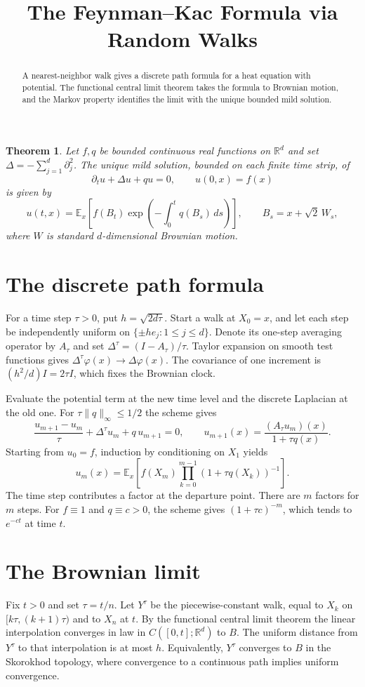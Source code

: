 \documentclass[11pt]{article}
\title{The Feynman--Kac Formula via Random Walks}
\author{}
\date{}
\newtheorem{theorem}{Theorem}
\begin{document}
\maketitle

\begin{abstract}
A nearest-neighbor walk gives a discrete path formula for a heat equation
with potential. The functional central limit theorem takes the formula to
Brownian motion, and the Markov property identifies the limit with the
unique bounded mild solution.
\end{abstract}

\begin{theorem}
Let $f,q$ be bounded continuous real functions on $\mathbb R^d$ and set
$\Delta=-\sum_{j=1}^d\partial_j^2$. The unique mild solution, bounded on
each finite time strip, of
\[
  \partial_tu+\Delta u+qu=0,\qquad u(0,x)=f(x)
\]
is given by
\[
  u(t,x)=\mathbb E_x\!\left[
   f(B_t)\exp\!\left(-\int_0^t q(B_s)\,ds\right)\right],
  \qquad B_s=x+\sqrt{2}\,W_s,
\]
where $W$ is standard $d$-dimensional Brownian motion.
\end{theorem}

\section{The discrete path formula}
For a time step $\tau>0$, put $h=\sqrt{2d\tau}$. Start a walk at
$X_0=x$, and let each step be independently uniform on
$\{\pm h e_j:1\le j\le d\}$. Denote its one-step averaging operator
by $A_\tau$ and set $\Delta^\tau=(I-A_\tau)/\tau$.
Taylor expansion on smooth test functions gives
$\Delta^\tau\varphi(x)\to\Delta\varphi(x)$. The covariance of one
increment is $(h^2/d)I=2\tau I$, which fixes the Brownian clock.

Evaluate the potential term at the new time level and the discrete
Laplacian at the old one. For $\tau\|q\|_\infty\le 1/2$ the scheme gives
\[
  \frac{u_{m+1}-u_m}{\tau}+\Delta^\tau u_m+q\,u_{m+1}=0,
  \qquad
  u_{m+1}(x)=\frac{(A_\tau u_m)(x)}{1+\tau q(x)}.
\]
Starting from $u_0=f$, induction by conditioning on $X_1$ yields
\[
  u_m(x)=\mathbb E_x\!\left[
     f(X_m)\prod_{k=0}^{m-1}(1+\tau q(X_k))^{-1}\right].
\]
The time step contributes a factor at the departure point.
There are $m$ factors for $m$ steps. For $f\equiv1$ and $q\equiv c>0$,
the scheme gives $(1+\tau c)^{-m}$, which tends to $e^{-ct}$ at time $t$.

\section{The Brownian limit}
Fix $t>0$ and set $\tau=t/n$. Let $Y^\tau$ be the piecewise-constant
walk, equal to $X_k$ on $[k\tau,(k+1)\tau)$ and to $X_n$ at $t$.
By the functional central limit theorem the linear interpolation
converges in law in $C([0,t];\mathbb R^d)$ to $B$. The uniform
distance from $Y^\tau$ to that interpolation is at most $h$.
Equivalently, $Y^\tau$ converges to $B$ in the Skorokhod topology,
where convergence to a continuous path implies uniform convergence.
\end{document}
